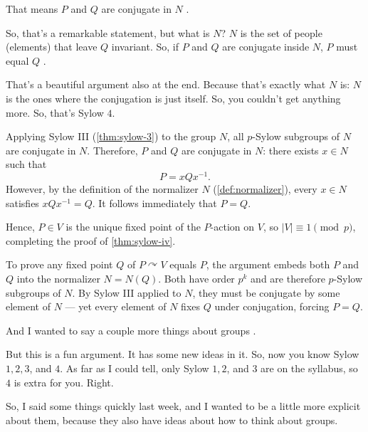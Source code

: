\begin{proofWrapper}
\begin{speech}[00:13:50 - 00:14:47]
That means $P$ and $Q$ are conjugate in $N$ .

So, that's a remarkable statement, but what is $N$? $N$ is the set of people (elements) that leave $Q$ invariant. So, if $P$ and $Q$ are conjugate inside $N$, $P$ must equal $Q$ .

That's a beautiful argument also at the end. Because that's exactly what $N$ is: $N$ is the ones where the conjugation is just itself. So, you couldn't get anything more. So, that's Sylow $4$.
\end{speech}

\begin{content}[Conclusion: \texorpdfstring{$P = Q$}{P = Q}]
Applying Sylow III (\cref{thm:sylow-3}) to the group $N$, all $p$-Sylow subgroups of $N$ are conjugate in $N$. Therefore, $P$ and $Q$ are conjugate in $N$: there exists $x \in N$ such that
\[
P = x Q x^{-1}.
\]
However, by the definition of the normalizer $N$ (\cref{def:normalizer}), every $x \in N$ satisfies $x Q x^{-1} = Q$. It follows immediately that $P = Q$.

Hence, $P \in V$ is the unique fixed point of the $P$-action on $V$, so $|V| \equiv 1 \pmod p$, completing the proof of \cref{thm:sylow-iv}.

\begin{steps}
To prove any fixed point $Q$ of $P \curvearrowright V$ equals $P$, the argument embeds both $P$ and $Q$ into the normalizer $N = N(Q)$. Both have order $p^k$ and are therefore $p$-Sylow subgroups of $N$. By Sylow III applied to $N$, they must be conjugate by some element of $N$ --- yet every element of $N$ fixes $Q$ under conjugation, forcing $P = Q$.
\end{steps}
\end{content}

\end{proofWrapper}

\begin{speech}[00:14:47 - 00:15:33]
And I wanted to say a couple more things about groups .

But this is a fun argument. It has some new ideas in it. So, now you know Sylow $1, 2, 3$, and $4$. As far as I could tell, only Sylow $1, 2$, and $3$ are on the syllabus, so $4$ is extra for you. Right.

So, I said some things quickly last week, and I wanted to be a little more explicit about them, because they also have ideas about how to think about groups.
\end{speech}

